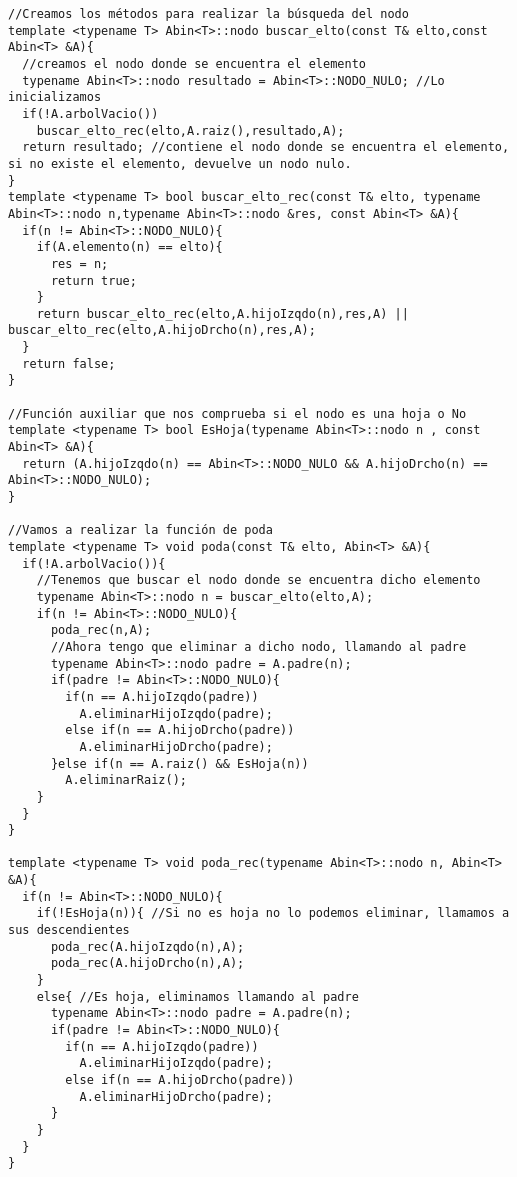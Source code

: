 \begin{verbatim}
//Creamos los métodos para realizar la búsqueda del nodo
template <typename T> Abin<T>::nodo buscar_elto(const T& elto,const Abin<T> &A){
  //creamos el nodo donde se encuentra el elemento
  typename Abin<T>::nodo resultado = Abin<T>::NODO_NULO; //Lo inicializamos
  if(!A.arbolVacio())
    buscar_elto_rec(elto,A.raiz(),resultado,A);
  return resultado; //contiene el nodo donde se encuentra el elemento, si no existe el elemento, devuelve un nodo nulo.
}
template <typename T> bool buscar_elto_rec(const T& elto, typename Abin<T>::nodo n,typename Abin<T>::nodo &res, const Abin<T> &A){
  if(n != Abin<T>::NODO_NULO){
    if(A.elemento(n) == elto){
      res = n;
      return true;
    }
    return buscar_elto_rec(elto,A.hijoIzqdo(n),res,A) || buscar_elto_rec(elto,A.hijoDrcho(n),res,A);
  }
  return false;
}

//Función auxiliar que nos comprueba si el nodo es una hoja o No
template <typename T> bool EsHoja(typename Abin<T>::nodo n , const Abin<T> &A){
  return (A.hijoIzqdo(n) == Abin<T>::NODO_NULO && A.hijoDrcho(n) == Abin<T>::NODO_NULO);
}

//Vamos a realizar la función de poda
template <typename T> void poda(const T& elto, Abin<T> &A){
  if(!A.arbolVacio()){
    //Tenemos que buscar el nodo donde se encuentra dicho elemento
    typename Abin<T>::nodo n = buscar_elto(elto,A);
    if(n != Abin<T>::NODO_NULO){
      poda_rec(n,A);
      //Ahora tengo que eliminar a dicho nodo, llamando al padre
      typename Abin<T>::nodo padre = A.padre(n);
      if(padre != Abin<T>::NODO_NULO){
        if(n == A.hijoIzqdo(padre))
          A.eliminarHijoIzqdo(padre);
        else if(n == A.hijoDrcho(padre))
          A.eliminarHijoDrcho(padre);
      }else if(n == A.raiz() && EsHoja(n))
        A.eliminarRaiz();
    }
  }
}

template <typename T> void poda_rec(typename Abin<T>::nodo n, Abin<T> &A){
  if(n != Abin<T>::NODO_NULO){
    if(!EsHoja(n)){ //Si no es hoja no lo podemos eliminar, llamamos a sus descendientes
      poda_rec(A.hijoIzqdo(n),A);
      poda_rec(A.hijoDrcho(n),A);
    }
    else{ //Es hoja, eliminamos llamando al padre
      typename Abin<T>::nodo padre = A.padre(n);
      if(padre != Abin<T>::NODO_NULO){
        if(n == A.hijoIzqdo(padre))
          A.eliminarHijoIzqdo(padre);
        else if(n == A.hijoDrcho(padre))
          A.eliminarHijoDrcho(padre);
      }
    }
  }
}

\end{verbatim}

